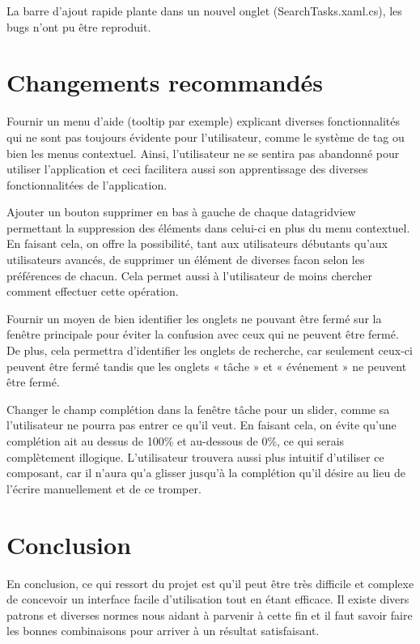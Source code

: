 \documentclass[letterpaper, oneside, 12pt, these, creativecommons]{thETS}
\begin{document}
La barre d'ajout rapide plante dans un nouvel onglet (SearchTasks.xaml.cs), les bugs n'ont pu être reproduit.

\chapter{Changements recommandés}

Fournir un menu d'aide (tooltip par exemple) explicant diverses fonctionnalités qui ne sont pas toujours évidente pour l'utilisateur, comme le système de tag ou bien les menus contextuel. Ainsi, l'utilisateur ne se sentira pas abandonné pour utiliser l'application et ceci facilitera aussi son apprentissage des diverses fonctionnalitées de l'application.

Ajouter un bouton supprimer en bas à gauche de chaque datagridview permettant la suppression des éléments dans celui-ci en plus du menu contextuel. En faisant cela, on offre la possibilité, tant aux utilisateurs débutants qu'aux utilisateurs avancés, de supprimer un élément de diverses facon selon les préférences de chacun. Cela permet aussi à l'utilisateur de moins chercher comment effectuer cette opération.

Fournir un moyen de bien identifier les onglets ne pouvant être fermé sur la fenêtre principale pour éviter la confusion avec ceux qui ne peuvent être fermé. De plus, cela permettra d'identifier les onglets de recherche, car seulement ceux-ci peuvent être fermé tandis que les onglets « tâche » et « événement » ne peuvent être fermé.

Changer le champ complétion dans la fenêtre tâche pour un slider, comme sa l'utilisateur ne pourra pas entrer ce qu'il veut. En faisant cela, on évite qu'une complétion ait au dessus de 100\% et au-dessous de 0\%, ce qui serais complètement illogique. L'utilisateur trouvera aussi plus intuitif d'utiliser ce composant, car il n'aura qu'a glisser jusqu'à la complétion qu'il désire au lieu de l'écrire manuellement et de ce tromper.

\chapter{Conclusion}

En conclusion, ce qui ressort du projet est qu'il peut être très difficile et complexe de concevoir un interface facile d'utilisation tout en étant efficace. Il existe divers patrons et diverses normes nous aidant à parvenir à cette fin et il faut savoir faire les bonnes combinaisons pour arriver à un résultat satisfaisant. 
\end{document}
